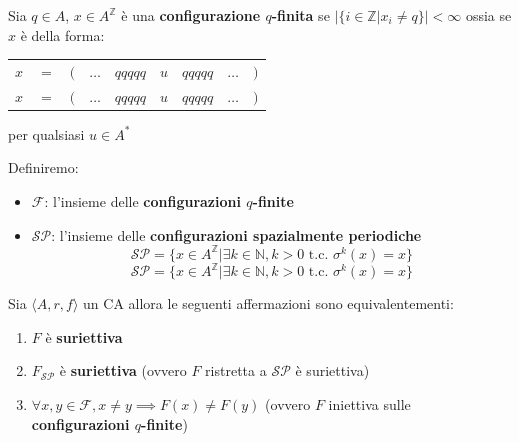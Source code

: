 \begin{definizione}
    Sia $q\in A$, $x\in A^\mathbb{Z}$ è una \textbf{configurazione $q$-finita}
    se $|\{i\in \mathbb{Z}| x_i\ne q\}|< \infty$ ossia se $x$ è della forma:
    \begin{table}[!h]
        \centering
        \begin{tabular}{ccccccccc}
            $x$ & $=$ & $($ & $\dots$ & $qqqqq$ & $u$ & $qqqqq$ & $\dots$ & $)$ \\
            $x$ & $=$ & $($ & $\dots$ & $qqqqq$ & $u$ & $qqqqq$ & $\dots$ & $)$ \\
        \end{tabular}
    \end{table}
    per qualsiasi $u\in A^\ast$
\end{definizione}

\begin{definizione}
    Definiremo:
    \begin{itemize}
        \item $\mathcal{F}$: l'insieme delle \textbf{configurazioni $q$-finite}
        \item $\mathcal{SP}$: l'insieme delle \textbf{configurazioni spazialmente periodiche}
              \begin{equation*}
                  \mathcal{SP}= \{x\in A^\mathbb{Z} | \exists k \in \mathbb{N}, k>0 \text{ t.c. }\sigma^k(x)=x\}
              \end{equation*}
              \begin{equation*}
                  \mathcal{SP}= \{x\in A^\mathbb{Z} | \exists k \in \mathbb{N}, k>0 \text{ t.c. }\sigma^k(x)=x\}
              \end{equation*}
    \end{itemize}
\end{definizione}

\begin{teorema}
    Sia $\langle A,r,f\rangle$ un CA allora le seguenti affermazioni sono equivalentementi:
    \begin{enumerate}
        \item $F$ è \textbf{suriettiva}
        \item $F_{\mathcal{SP}}$ è \textbf{suriettiva} (ovvero $F$ ristretta a $\mathcal{SP}$ è suriettiva)
        \item $\forall x,y \in \mathcal{F}, x\ne y \implies F(x)\ne F(y)$ (ovvero $F$ iniettiva sulle \textbf{configurazioni $q$-finite})
    \end{enumerate}
\end{teorema}

